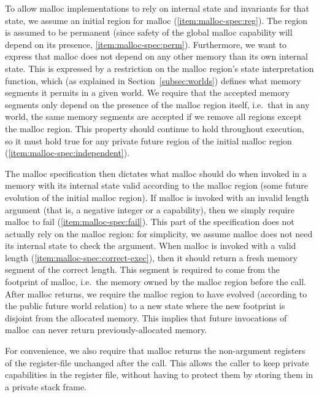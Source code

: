 \documentclass[format=acmsmall, review=true, screen=true]{acmart}
\renewcommand{\sectionname}{Section}
\newenvironment{toplas}%
    {\color{OliveGreen}}{}
\begin{document}
\begin{toplas}
To allow malloc implementations to rely on internal state and invariants for
that state, we assume an initial region for malloc (\ref{item:malloc-spec:reg}). The region is assumed to be
permanent (since safety of the global malloc capability will depend on its
presence, \ref{item:malloc-spec:perm}).
Furthermore, we want to express that malloc does not depend on any other memory
than its own internal state. This is expressed by a restriction on the malloc
region's state interpretation function, which (as explained in
\sectionname~\ref{subsec:worlds}) defines what memory segments it permits in a
given world. We require that the accepted memory segments only depend on the
presence of the malloc region itself, i.e.\ that in any world, the same memory
segments are accepted if we remove all regions except the malloc region. This
property should continue to hold throughout execution, so it must hold true for
any private future region of the initial malloc region (\ref{item:malloc-spec:independent}).

The malloc specification then dictates what malloc should do when invoked in a
memory with its internal state valid according to the malloc region (some future
evolution of the initial malloc region). If malloc is invoked with an invalid
length argument (that is, a negative integer or a capability), then we simply
require malloc to fail (\ref{item:malloc-spec:fail}). This part of the
specification does not actually rely on the malloc region: for simplicity, we
assume malloc does not need its internal state to check the argument. When
malloc is invoked with a valid length (\ref{item:malloc-spec:correct-exec}),
then it should return a fresh memory segment of the correct length. This segment
is required to come from the footprint of malloc, i.e.\ the memory owned by the
malloc region before the call. After malloc returns, we require the malloc
region to have evolved (according to the public future world relation) to a new
state where the new footprint is disjoint from the allocated memory. This
implies that future invocations of malloc can never return previously-allocated
memory.

For convenience, we also require that malloc returns the non-argument registers
of the register-file unchanged after the call. This allows the caller to keep
private capabilities in the register file, without having to protect them by
storing them in a private stack frame.


\end{toplas}
\end{document}

